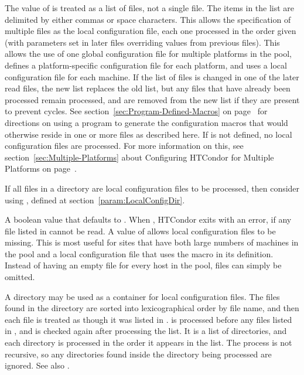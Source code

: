 \begin{description}
  The value of  is treated as a list of files,
  not a
  single file.  The items in the list are delimited by either commas
  or space characters.
  This allows the specification of multiple files as
  the local configuration file, each one processed in the
  order given (with parameters set in later files overriding values
  from previous files).  This allows the use of one global
  configuration file for multiple platforms in the pool, defines a
  platform-specific configuration file for each platform, and uses a
  local configuration file for each machine. 
  If the list of files is changed in one of the later read files, the new list
  replaces the old list, but any files that have already been processed
  remain processed, and are removed from the new list if they are present
  to prevent cycles.
  See section~\ref{sec:Program-Defined-Macros} on 
  page~\pageref{sec:Program-Defined-Macros} for directions on
  using a program to generate the configuration macros that would
  otherwise reside in one or more files as described here.
  If  is not defined, no local configuration
  files are processed.  For more information on this, see
  section~\ref{sec:Multiple-Platforms} about Configuring HTCondor for
  Multiple Platforms on page~\pageref{sec:Multiple-Platforms}.

  If all files in a directory are local configuration files to be processed,
  then consider using , defined at
  section~\ref{param:LocalConfigDir}.

\label{param:RequireLocalConfigFile}
\item[\Macro{REQUIRE\_LOCAL\_CONFIG\_FILE}]
  A boolean value that defaults to .
  When , HTCondor exits with an error,
  if any file listed in  cannot be read.
  A value of  allows local configuration files to be missing.
  This is most useful for sites that have 
  both large numbers of machines in the pool and a local configuration file
  that uses the  macro in its definition.
  Instead of having an empty file for every host
  in the pool, files can simply be omitted.

\label{param:LocalConfigDir} 
\item[\Macro{LOCAL\_CONFIG\_DIR}]
  A directory may be used as a container for local configuration files. 
  The files found in the directory are sorted into lexicographical order 
  by file name, and 
  then each file is treated as though it was listed in 
  . 
   is processed before any files listed in 
  , and is checked again after processing
  the  list. 
  It is a list of directories, and each directory is processed in the order
  it appears in the list. 
  The process is not recursive, so any directories found inside the directory
  being processed are ignored. 
  See also .


\end{description}
